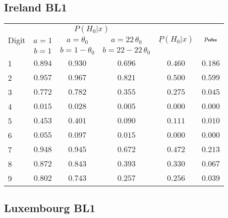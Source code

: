 \documentclass[12pt,a4paper,draft]{article}
\begin{document}
\subsection{Ireland BL1}

\begin{table}[H] 
\begin{center}
\begin{tabular}{|l|c|c|c|c|c|}

\hline
\multicolumn{1}{|c|}{\multirow{3}{*}{Digit}} & \multicolumn{3}{c|}{$P{(H_0|{x})}$} &  \multicolumn{1}{c|}{\multirow{3}{*}{${\underline{P}}{(H_0|{x})}$}} & \multicolumn{1}{c|}{\multirow{3}{*}{${p_{\text{\textbf{obs}}}}$}} \tabularnewline
\cline{2-4}
&\multicolumn{1}{c|}{$a=1$}&\multicolumn{1}{c|}{$a = \theta_0$}&\multicolumn{1}{c|}{$a = 22 \, \theta_0$}& & \\
&\multicolumn{1}{c|}{$b=1$}&\multicolumn{1}{c|}{$b = 1-\theta_0$}&\multicolumn{1}{c|}{$b = 22-22 \, \theta_0$}& &\\
\hline

1&$0.894$&$0.930$&$0.696$&$0.460$&$0.186$\tabularnewline
2&$0.957$&$0.967$&$0.821$&$0.500$&$0.599$\tabularnewline
3&$0.772$&$0.782$&$0.355$&$0.275$&$0.045$\tabularnewline
4&$0.015$&$0.028$&$0.005$&$0.000$&$0.000$\tabularnewline
5&$0.453$&$0.401$&$0.090$&$0.111$&$0.010$\tabularnewline
6&$0.055$&$0.097$&$0.015$&$0.000$&$0.000$\tabularnewline
7&$0.948$&$0.945$&$0.672$&$0.472$&$0.213$\tabularnewline
8&$0.872$&$0.843$&$0.393$&$0.330$&$0.067$\tabularnewline
9&$0.802$&$0.743$&$0.257$&$0.256$&$0.039$\tabularnewline
\hline
\end{tabular}\end{center}
\end{table}

\subsection{Luxembourg BL1}
\end{document}
